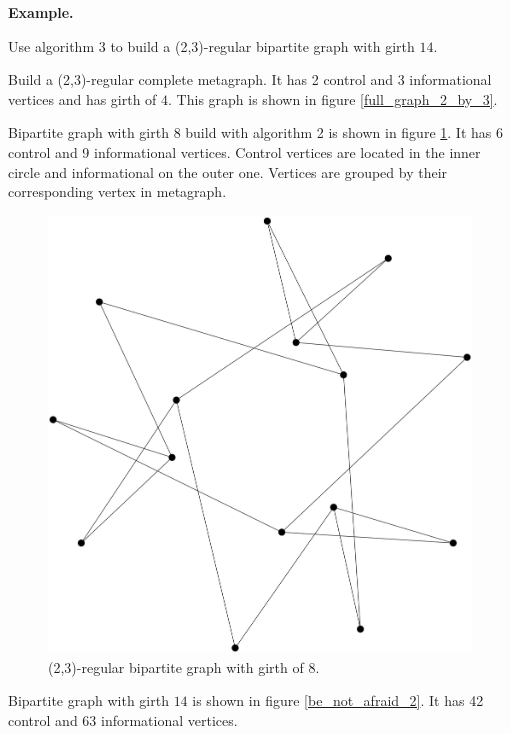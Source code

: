 \documentclass[14pt]{mmcs-article}
\begin{document}
\textbf{Example.}

Use algorithm 3 to build a (2,3)-regular bipartite graph with girth $14$.

Build a (2,3)-regular complete metagraph. It has 2 control and 3 informational vertices and has girth of $4$. This graph is shown in figure \ref{full_graph_2_by_3}.

Bipartite graph with girth $8$ build with algorithm 2 is shown in figure \ref{be_not_afraid}. It has 6 control and 9 informational vertices. Control vertices are located in the inner circle and informational on the outer one. Vertices are grouped by their corresponding vertex in metagraph.

\begin{figure}[H]
    \centering
    \includegraphics[scale=0.2]{graph_2.png}
    \caption{ (2,3)-regular bipartite graph with girth of 8. }
    \label{be_not_afraid}
\end{figure}

Bipartite graph with girth $14$ is shown in figure \ref{be_not_afraid_2}. It has 42 control and 63 informational vertices.
\end{document}
